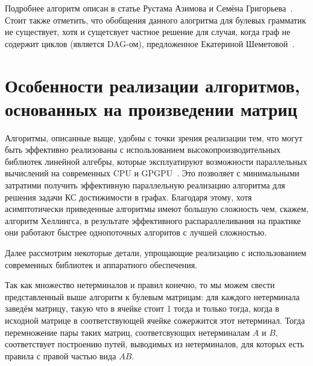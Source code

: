 Подробнее алгоритм описан в статье Рустама Азимова и Семёна Григорьева~\cite{565CECD7E8F5C6063935B41DB41797AA37D53B04}. Стоит также отметить, что обобщения данного алогритма для булевых грамматик не существует, хотя и сущетсвует частное решение для случая, когда граф не содержит циклов (является DAG-ом), предложенное Екатериной Шеметовой~\cite{Shemetova2019}.

\section{Особенности реализации алгоритмов, основанных на произведении матриц}

Алгоритмы, описанные выще, удобны с точки зрения реализации тем, что могут быть эффективно реализованы с использованием высокопроизводительных библиотек линейной алгебры, которые эксплуатируют возможности параллельных вычислений на современных CPU и  GPGPU~\cite{Mishin:2019:ECP:3327964.3328503}. 
Это позволяет с минимальными затратими получить эффективную параллельную реализацию алгоритма для решения задачи КС достижимости в графах. 
Благодаря этому, хотя асимптотически приведенные алгоритмы имеют большую сложность чем, скажем, алгоритм Хеллингса, в результате эффективного распараллеливания на практике они работают быстрее однопоточных алгоритов с лучшей сложностью.

Далее рассмотрим некоторые детали, упрощающие реализацию с использованием современных библиотек и аппаратного обеспечения.

Так как множество нетерминалов и правил конечно, то мы можем свести представленный выше алгоритм к булевым матрицам: для каждого нетерминала заведём матрицу, такую что в ячейке стоит 1 тогда и только тогда, когда в исходной матрице в соответствующей ячейке сожержится этот нетерминал.
Тогда перемножение пары таких матриц, соответсвующих нетерминалам $A$ и $B$, соответствует построению путей, выводимых из нетерминалов, для которых есть правила с правой частью вида $A B$. 

